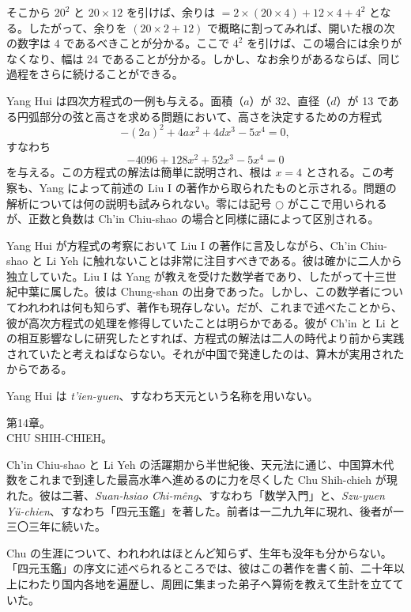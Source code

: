 \documentclass[11pt]{article}
\newcommand{\scanpage}[2]{\clearpage\setcounter{footnote}{0}\noindent{\footnotesize\color{gray}PDF #1 頁 · #2}\par\medskip}
\newcommand{\scanfooter}{}
\begin{document}
そこから $20^2$ と $20\times12$ を引けば、余りは $=2\times(20\times4)+12\times4+4^2$ となる。したがって、余りを $(20\times2+12)$ で概略に割ってみれば、開いた根の次の数字は 4 であるべきことが分かる。ここで $4^2$ を引けば、この場合には余りがなくなり、幅は 24 であることが分かる。しかし、なお余りがあるならば、同じ過程をさらに続けることができる。

Yang Hui は四次方程式の一例も与える。面積（$a$）が 32、直径（$d$）が 13 である円弧部分の弦と高さを求める問題において、高さを決定するための方程式
\[
-(2a)^2+4ax^2+4dx^3-5x^4=0,
\]
すなわち
\[
-4096+128x^2+52x^3-5x^4=0
\]
を与える。この方程式の解法は簡単に説明され、根は $x=4$ とされる。この考察も、Yang によって前述の Liu I の著作から取られたものと示される。問題の解析については何の説明も試みられない。零には記号 $\bigcirc$ がここで用いられるが、正数と負数は Ch'in Chiu-shao の場合と同様に語によって区別される。

Yang Hui が方程式の考察において Liu I の著作に言及しながら、Ch'in Chiu-shao と Li Yeh に触れないことは非常に注目すべきである。彼は確かに二人から独立していた。Liu I は Yang が教えを受けた数学者であり、したがって十三世紀中葉に属した。彼は Chung-shan の出身であった。しかし、この数学者についてわれわれは何も知らず、著作も現存しない。だが、これまで述べたことから、彼が高次方程式の処理を修得していたことは明らかである。彼が Ch'in と Li との相互影響なしに研究したとすれば、方程式の解法は二人の時代より前から実践されていたと考えねばならない。それが中国で発達したのは、算木が実用されたからである。

Yang Hui は \emph{t'ien-yuen}、すなわち天元という名称を用いない。
\scanfooter

\scanpage{0103}{第14章冒頭、印刷頁89}
\setcounter{footnote}{0}
\begin{center}
第14章。\\
CHU SHIH-CHIEH。
\end{center}

Ch'in Chiu-shao と Li Yeh の活躍期から半世紀後、天元法に通じ、中国算木代数をこれまで到達した最高水準へ進めるのに力を尽くした Chu Shih-chieh が現れた。彼は二著、\emph{Suan-hsiao Chi-mêng}、すなわち「数学入門」と、\emph{Szu-yuen Yü-chien}、すなわち「四元玉鑑」を著した。前者は一二九九年に現れ、後者が一三〇三年に続いた。

Chu の生涯について、われわれはほとんど知らず、生年も没年も分からない。「四元玉鑑」の序文に述べられるところでは、彼はこの著作を書く前、二十年以上にわたり国内各地を遍歴し、周囲に集まった弟子へ算術を教えて生計を立てていた。
\end{document}
